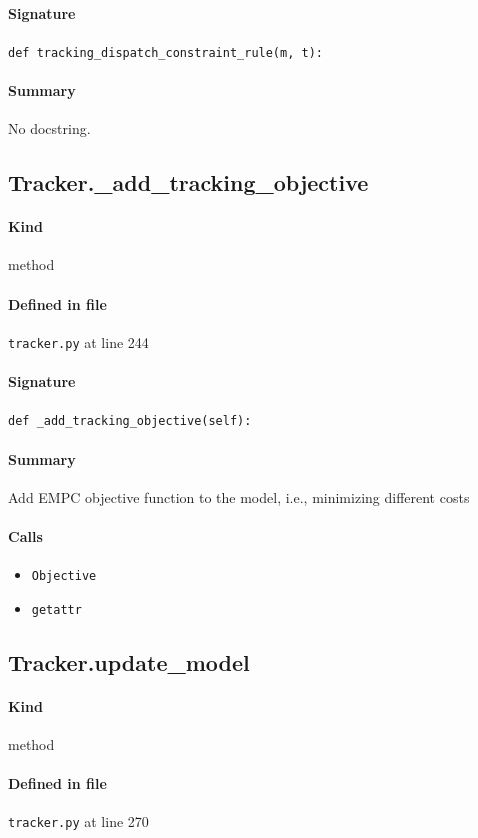 \documentclass[11pt]{report}
\begin{document}
\paragraph{Signature} \texttt{def tracking\_dispatch\_constraint\_rule(m, t):}
\paragraph{Summary} No docstring.
\subsection{Tracker.\_add\_tracking\_objective}
\label{def:tracker.py:Tracker._add_tracking_objective:L244}
\paragraph{Kind} method
\paragraph{Defined in file} \texttt{tracker.py} at line 244
\paragraph{Signature} \texttt{def \_add\_tracking\_objective(self):}
\paragraph{Summary} Add EMPC objective function to the model, i.e., minimizing different costs
\paragraph{Calls}
\begin{itemize}[leftmargin=*]
  \item \texttt{Objective}
  \item \texttt{getattr}
\end{itemize}
\subsection{Tracker.update\_model}
\label{def:tracker.py:Tracker.update_model:L270}
\paragraph{Kind} method
\paragraph{Defined in file} \texttt{tracker.py} at line 270
\end{document}

